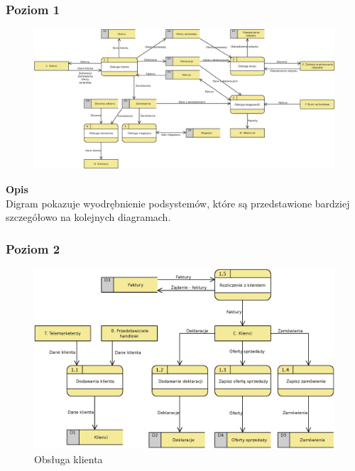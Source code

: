 \begin{landscape}
	\subsubsection{Poziom 1}
		\begin{figure}[H]
			\centering
			\centerline{\includegraphics[width=29cm]{img/DFD/1-level.eps}}
		\end{figure}
\end{landscape}

	\textbf{Opis}\\
	Digram pokazuje wyodrębnienie podsystemów, które są przedstawione bardziej szczegółowo na kolejnych diagramach.

	

\subsubsection{Poziom 2}

	\begin{figure}[H]
		\centering
		\centerline{\includegraphics[width=1.2\textwidth]{img/DFD/2-level-klient.eps}}
		\caption{Obsługa klienta}
	\end{figure}

